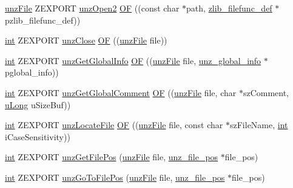 \begin{DoxyCompactItemize}
\item 
\hyperlink{namespacezlib_a48c1eb530e72d2132ea9cb6648f4047e}{unz\+File} Z\+E\+X\+P\+O\+RT \hyperlink{unzip_8c_a899fa69e894354e48aab8869e13fd396}{unz\+Open2} \hyperlink{namespacezlib_a98d73ab7a866fea2ec4c8565b43df518}{OF} ((const char $\ast$path, \hyperlink{namespacezlib_a4ada5a935fba7f21209bc451eb7ffbc7}{zlib\+\_\+filefunc\+\_\+def} $\ast$pzlib\+\_\+filefunc\+\_\+def))
\item 
\hyperlink{namespacezlib_a0c9da18d93722fcf02a354ae2b6ec1ba}{int} Z\+E\+X\+P\+O\+RT \hyperlink{unzip_8c_af6ab0ba88ab5da62747df8f9336f1bb3}{unz\+Close} \hyperlink{namespacezlib_ac2146e287516d1f6d752ff7aadcc701a}{OF} ((\hyperlink{namespacezlib_a48c1eb530e72d2132ea9cb6648f4047e}{unz\+File} file))
\item 
\hyperlink{namespacezlib_a0c9da18d93722fcf02a354ae2b6ec1ba}{int} Z\+E\+X\+P\+O\+RT \hyperlink{unzip_8c_af05d6e3eac6ec396d9d134ca140fec61}{unz\+Get\+Global\+Info} \hyperlink{namespacezlib_a97b37021181fc23f5ea23211508ab36a}{OF} ((\hyperlink{namespacezlib_a48c1eb530e72d2132ea9cb6648f4047e}{unz\+File} file, \hyperlink{namespacezlib_a720c995c51babbb6d5cbf3e022a4c7b4}{unz\+\_\+global\+\_\+info} $\ast$pglobal\+\_\+info))
\item 
\hyperlink{namespacezlib_a0c9da18d93722fcf02a354ae2b6ec1ba}{int} Z\+E\+X\+P\+O\+RT \hyperlink{unzip_8c_adc36ff0866254ca420c9cd9d7dccfa99}{unz\+Get\+Global\+Comment} \hyperlink{namespacezlib_a188df54d20ceef29699b2d55e71a9bc1}{OF} ((\hyperlink{namespacezlib_a48c1eb530e72d2132ea9cb6648f4047e}{unz\+File} file, char $\ast$sz\+Comment, \hyperlink{namespacezlib_a3bc0123d9337acd75d286df79e6cf7da}{u\+Long} u\+Size\+Buf))
\item 
\hyperlink{namespacezlib_a0c9da18d93722fcf02a354ae2b6ec1ba}{int} Z\+E\+X\+P\+O\+RT \hyperlink{unzip_8c_a22730edef5a8a98b367bb30a0d619608}{unz\+Locate\+File} \hyperlink{namespacezlib_a900bec23fa1ab35dc282e84da54ec7ff}{OF} ((\hyperlink{namespacezlib_a48c1eb530e72d2132ea9cb6648f4047e}{unz\+File} file, const char $\ast$sz\+File\+Name, \hyperlink{namespacezlib_a0c9da18d93722fcf02a354ae2b6ec1ba}{int} i\+Case\+Sensitivity))
\item 
\hyperlink{namespacezlib_a0c9da18d93722fcf02a354ae2b6ec1ba}{int} Z\+E\+X\+P\+O\+RT \hyperlink{namespacezlib_a47437b346d579699d430dc268e4590e9}{unz\+Get\+File\+Pos} (\hyperlink{namespacezlib_a48c1eb530e72d2132ea9cb6648f4047e}{unz\+File} file, \hyperlink{namespacezlib_aafe5edb16e400a11811c203048d2f464}{unz\+\_\+file\+\_\+pos} $\ast$file\+\_\+pos)
\item 
\hyperlink{namespacezlib_a0c9da18d93722fcf02a354ae2b6ec1ba}{int} Z\+E\+X\+P\+O\+RT \hyperlink{namespacezlib_a8ba48b65e356243eb937bcbcebc7501d}{unz\+Go\+To\+File\+Pos} (\hyperlink{namespacezlib_a48c1eb530e72d2132ea9cb6648f4047e}{unz\+File} file, \hyperlink{namespacezlib_aafe5edb16e400a11811c203048d2f464}{unz\+\_\+file\+\_\+pos} $\ast$file\+\_\+pos)

\end{DoxyCompactItemize}
